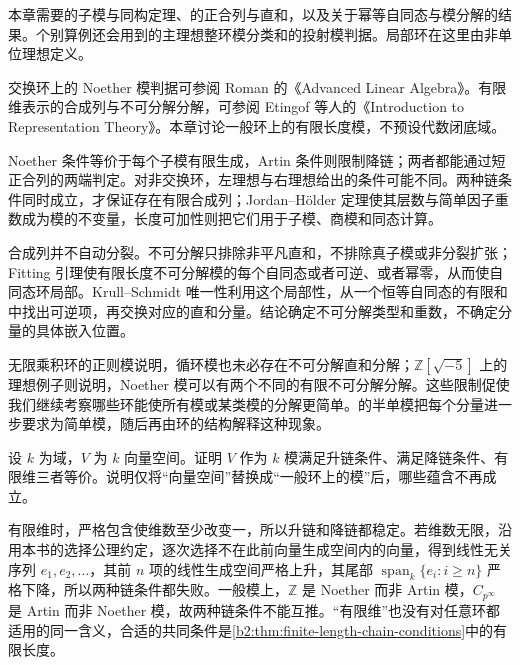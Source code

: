 \ProseParagraphBreak

本章需要的子模与同构定理、的正合列与直和，以及关于幂等自同态与模分解的结果。个别算例还会用到的主理想整环模分类和的投射模判据。局部环在这里由非单位理想定义。

\ProseParagraphBreak
交换环上的 Noether 模判据可参阅 Roman 的《Advanced Linear Algebra》\cite[Chapter 5, Theorem 5.7, pp. 133--134]{Roman2008AdvancedLinearAlgebra}。有限维表示的合成列与不可分解分解，可参阅 Etingof 等人的《Introduction to Representation Theory》\cite[Theorem 3.7.1, pp. 50--51; Theorem 3.8.1, pp. 51--52]{EtingofEtAl2011RepresentationTheory}。本章讨论一般环上的有限长度模，不预设代数闭底域。






\begin{chaptersummary}
	Noether 条件等价于每个子模有限生成，Artin 条件则限制降链；两者都能通过短正合列的两端判定。对非交换环，左理想与右理想给出的条件可能不同。两种链条件同时成立，才保证存在有限合成列；Jordan–Hölder 定理使其层数与简单因子重数成为模的不变量，长度可加性则把它们用于子模、商模和同态计算。

	\ProseParagraphBreak
	合成列并不自动分裂。不可分解只排除非平凡直和，不排除真子模或非分裂扩张；Fitting 引理使有限长度不可分解模的每个自同态或者可逆、或者幂零，从而使自同态环局部。Krull–Schmidt 唯一性利用这个局部性，从一个恒等自同态的有限和中找出可逆项，再交换对应的直和分量。结论确定不可分解类型和重数，不确定分量的具体嵌入位置。

	\ProseParagraphBreak
	无限乘积环的正则模说明，循环模也未必存在不可分解直和分解；\(\mathbb Z[\sqrt{-5}]\) 上的理想例子则说明，Noether 模可以有两个不同的有限不可分解分解。这些限制促使我们继续考察哪些环能使所有模或某类模的分解更简单。的半单模把每个分量进一步要求为简单模，随后再由环的结构解释这种现象。
\end{chaptersummary}

\BookExercises

\begin{exercise}\label{b2:ex:12-vector-chain-conditions}
	设 \(k\) 为域，\(V\) 为 \(k\) 向量空间。证明 \(V\) 作为 \(k\) 模满足升链条件、满足降链条件、有限维三者等价。说明仅将“向量空间”替换成“一般环上的模”后，哪些蕴含不再成立。
\end{exercise}
\begin{solution}
	有限维时，严格包含使维数至少改变一，所以升链和降链都稳定。若维数无限，沿用本书的选择公理约定，逐次选择不在此前向量生成空间内的向量，得到线性无关序列 \(e_1,e_2,\ldots\)，其前 \(n\) 项的线性生成空间严格上升，其尾部 \(\operatorname{span}_k\{e_i:i\ge n\}\) 严格下降，所以两种链条件都失败。一般模上，\(\mathbb Z\) 是 Noether 而非 Artin 模，\(C_{p^\infty}\) 是 Artin 而非 Noether 模，故两种链条件不能互推。“有限维”也没有对任意环都适用的同一含义，合适的共同条件是\cref{b2:thm:finite-length-chain-conditions}中的有限长度。
\end{solution}

